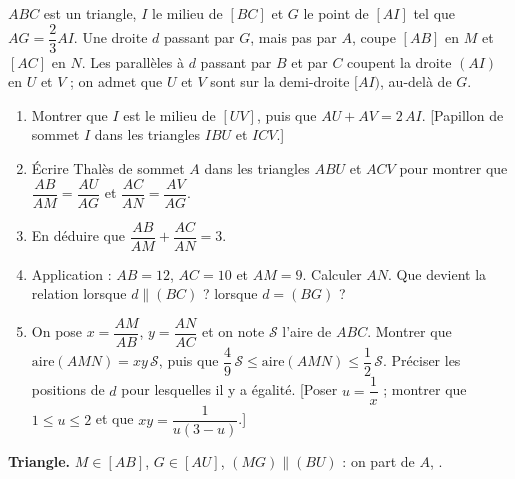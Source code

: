 \documentclass[12pt,a4paper]{article}
\begin{document}
\begin{corr}[title={Une droite par le centre de gravité}, stars=4, source={Axiomaths}]
$ABC$ est un triangle, $I$ le milieu de $[BC]$ et $G$ le point de $[AI]$ tel que $AG=\dfrac23AI$. Une droite $d$ passant par $G$, mais pas par $A$, coupe $[AB]$ en $M$ et $[AC]$ en $N$. Les parallèles à $d$ passant par $B$ et par $C$ coupent la droite $(AI)$ en $U$ et $V$ ; on admet que $U$ et $V$ sont sur la demi-droite $[AI)$, au-delà de $G$.

\begin{center}
\end{center}
\begin{enumerate}
  \item Montrer que $I$ est le milieu de $[UV]$, puis que $AU+AV=2\,AI$. [Papillon de sommet $I$ dans les triangles $IBU$ et $ICV$.]
  \item Écrire Thalès de sommet $A$ dans les triangles $ABU$ et $ACV$ pour montrer que $\dfrac{AB}{AM}=\dfrac{AU}{AG}$ et $\dfrac{AC}{AN}=\dfrac{AV}{AG}$.
  \item En déduire que $\dfrac{AB}{AM}+\dfrac{AC}{AN}=3$.
  \item Application : $AB=12$, $AC=10$ et $AM=9$. Calculer $AN$. Que devient la relation lorsque $d\parallel(BC)$ ? lorsque $d=(BG)$ ?
  \item On pose $x=\dfrac{AM}{AB}$, $y=\dfrac{AN}{AC}$ et on note $\mathcal S$ l'aire de $ABC$. Montrer que $\text{aire}(AMN)=xy\,\mathcal S$, puis que $\dfrac49\,\mathcal S\leq\text{aire}(AMN)\leq\dfrac12\,\mathcal S$. Préciser les positions de $d$ pour lesquelles il y a égalité. [Poser $u=\dfrac1x$ ; montrer que $1\leq u\leq2$ et que $xy=\dfrac1{u(3-u)}$.]
\end{enumerate}
\axsol
\begin{prop}
\textbf{Triangle.} $M\in[AB]$, $G\in[AU]$, $(MG)\parallel(BU)$ : on part de $A$, .


\end{prop}
\end{corr}
\end{document}
